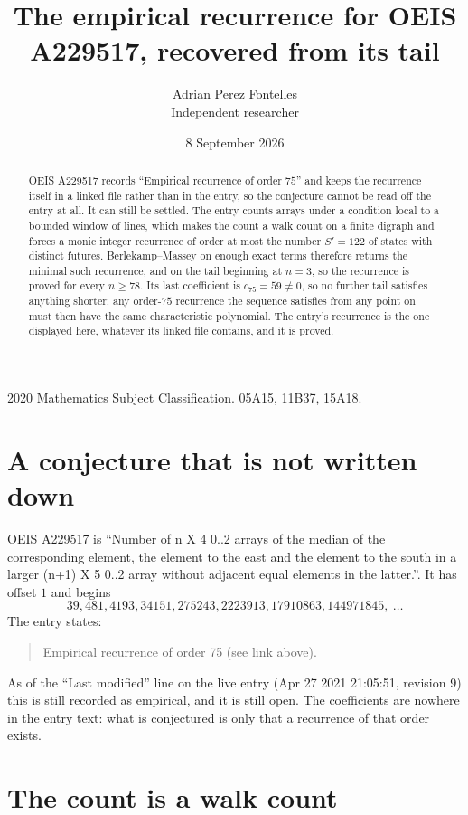 \documentclass[11pt,a4paper]{article}
\title{The empirical recurrence for OEIS A229517, recovered from its tail}
\author{Adrian Perez Fontelles\\ \small Independent researcher}
\date{8 September 2026}
\theoremstyle{plain}
\theoremstyle{definition}
\begin{document}
\maketitle

\begin{abstract}
OEIS A229517 records ``Empirical recurrence of order $75$'' and keeps the recurrence itself in
a linked file rather than in the entry, so the conjecture cannot be read off the entry at all.
It can still be settled. The entry counts arrays under a condition local to a bounded window of
lines, which makes the count a walk count on a finite digraph and forces a monic integer
recurrence of order at most the number $S'=122$ of states with distinct futures. Berlekamp--Massey on
enough exact terms therefore returns the minimal such recurrence, and on the tail beginning at $n=3$, so the recurrence is proved for every $n\ge78$.
Its last coefficient is $c_{75}=59\neq0$, so no further tail satisfies anything
shorter; any order-$75$ recurrence the sequence satisfies from any point on must then have
the same characteristic polynomial. The entry's recurrence is the one displayed here, whatever
its linked file contains, and it is proved.
\end{abstract}

\noindent\small 2020 Mathematics Subject Classification. 05A15, 11B37, 15A18.\normalsize

\section{A conjecture that is not written down}

OEIS A229517 is ``Number of n X 4 0..2 arrays of the median of the corresponding element, the element to the east and the element to the south in a larger (n+1) X 5 0..2 array without adjacent equal elements in the latter.''. It has offset $1$ and begins
\[
39, 481, 4193, 34151, 275243, 2223913, 17910863, 144971845,\ \dots
\]
The entry states:
\begin{quote}
Empirical recurrence of order 75 (see link above).
\end{quote}
As of the ``Last modified'' line on the live entry (Apr 27 2021 21:05:51, revision 9)
this is still recorded as empirical, and it is still open. The coefficients are nowhere in the
entry text: what is conjectured is only that a recurrence of that order exists.

\section{The count is a walk count}
\end{document}
